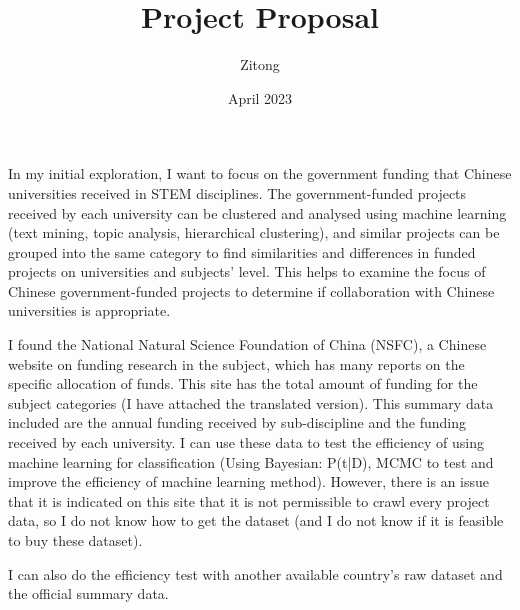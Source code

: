\documentclass{article}
\title{Project Proposal}
\author{Zitong }
\date{April 2023}
\begin{document}
\maketitle

In my initial exploration, I want to focus on the government funding that Chinese universities received in STEM disciplines. The government-funded projects received by each university can be clustered and analysed using machine learning (text mining, topic analysis, hierarchical clustering), and similar projects can be grouped into the same category to find similarities and differences in funded projects on universities and subjects’ level. This helps to examine the focus of Chinese government-funded projects to determine if collaboration with Chinese universities is appropriate. 

I found the National Natural Science Foundation of China (NSFC), a Chinese website on funding research in the subject, which has many reports on the specific allocation of funds. This site has the total amount of funding for the subject categories (I have attached the translated version). This summary data included are the annual funding received by sub-discipline and the funding received by each university. I can use these data to test the efficiency of using machine learning for classification (Using Bayesian: P(t|D), MCMC to test and improve the efficiency of machine learning method). However, there is an issue that it is indicated on this site that it is not permissible to crawl every project data, so I do not know how to get the dataset (and I do not know if it is feasible to buy these dataset). 

I can also do the efficiency test with another available country’s raw dataset and the official summary data.
\end{document}
